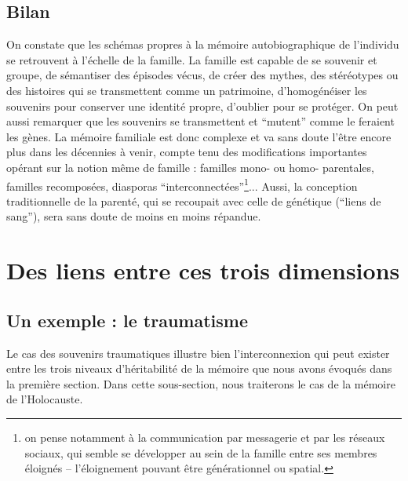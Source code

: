 \documentclass[french]{article}
\begin{document}
	
		\subsection{Bilan}
			On constate que les schémas propres à la mémoire autobiographique de l'individu se retrouvent à l'échelle de la famille. La famille est capable de se souvenir et groupe, de sémantiser des épisodes vécus, de créer des mythes, des stéréotypes ou des histoires qui se transmettent comme un patrimoine, d'homogénéiser les souvenirs pour conserver une identité propre, d'oublier pour se protéger. On peut aussi remarquer que les souvenirs se transmettent et ``mutent'' comme le feraient les gènes. La mémoire familiale est donc complexe et va sans doute l'être encore plus dans les décennies à venir, compte tenu des modifications importantes opérant sur la notion même de famille : familles mono- ou homo- parentales, familles recomposées, diasporas ``interconnectées''\footnote{on pense notamment à la communication par messagerie et par les réseaux sociaux, qui semble se développer au sein de la famille entre ses membres éloignés -- l'éloignement pouvant être générationnel ou spatial.}... Aussi, la conception traditionnelle de la parenté, qui se recoupait avec celle de génétique (``liens de sang''), sera sans doute de moins en moins répandue.
		
	\section{Des liens entre ces trois dimensions}\label{liens}
		\subsection{Un exemple : le traumatisme}
			Le cas des souvenirs traumatiques illustre bien l'interconnexion qui peut exister entre les trois niveaux d'héritabilité de la mémoire que nous avons évoqués dans la première section. Dans cette sous-section, nous traiterons le cas de la mémoire de l'Holocauste.
\end{document}
